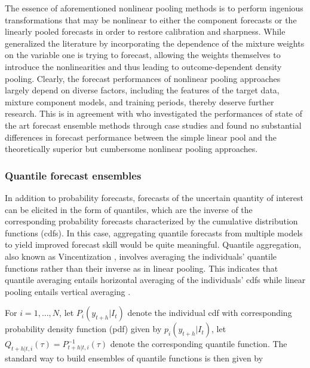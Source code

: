 \documentclass[11pt]{article}
\begin{document}
The essence of aforementioned nonlinear pooling methods is to perform ingenious transformations that may be nonlinear to either the component forecasts or the linearly pooled forecasts in order to restore calibration and sharpness. While \cite{Kapetanios2015-bb} generalized the literature by incorporating the dependence of the mixture weights on the variable one is trying to forecast, allowing the weights themselves to introduce the nonlinearities and thus leading to outcome-dependent density pooling. Clearly, the forecast performances of nonlinear pooling approaches largely depend on diverse factors, including the features of the target data, mixture component models, and training periods, thereby deserve further research. This is in agreement with \cite{Baran2018-nm} who investigated the performances of state of the art forecast ensemble methods through case studies and found no substantial differences in forecast performance between the simple linear pool and the theoretically superior but cumbersome nonlinear pooling approaches.

\subsubsection{Quantile forecast ensembles}
\label{sec:quantile_forecast_ensembles}

In addition to probability forecasts, forecasts of the uncertain quantity of interest can be elicited in the form of quantiles, which are the inverse of the corresponding probability forecasts characterized by the cumulative distribution functions (cdfs). In this case, aggregating quantile forecasts from multiple models to yield improved forecast skill would be quite meaningful. Quantile aggregation, also known as Vincentization \citep{vincent1912-fu}, involves averaging the individuals' quantile functions rather than their inverse as in linear pooling. This indicates that quantile averaging entails horizontal averaging of the individuals' cdfs while linear pooling entails vertical averaging \citep{Lichtendahl2013-rt}.

For $i=1,\ldots,N$, let $P_{i}(y_{t+h}|I_{t})$ denote the individual cdf with corresponding probability density function (pdf) given by $p_{i}(y_{t+h}|I_{t})$, let $Q_{t+h|t,i}(\tau) = P_{t+h|t,i}^{-1}(\tau)$ denote the corresponding quantile function. The standard way to build ensembles of quantile functions is then given by
\end{document}
